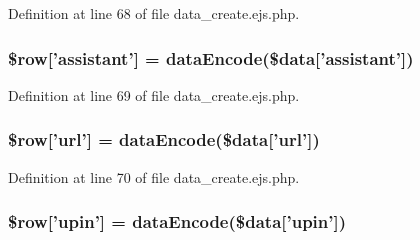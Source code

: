 \-Definition at line 68 of file data\-\_\-create.\-ejs.\-php.

\hypertarget{miscellaneous_2mysettings_2data__create_8ejs_8php_ac70ddecf301c4fec9f747b5c7c861243}{
\subsubsection[{\$row}]{\setlength{\rightskip}{0pt plus 5cm}\$row\mbox{[}'assistant'\mbox{]} = {\bf data\-Encode}(\$data\mbox{[}'assistant'\mbox{]})}}\label{miscellaneous_2mysettings_2data__create_8ejs_8php_ac70ddecf301c4fec9f747b5c7c861243}


\-Definition at line 69 of file data\-\_\-create.\-ejs.\-php.

\hypertarget{miscellaneous_2mysettings_2data__create_8ejs_8php_adf1010d02c9d45b59dd4435673a49506}{
\subsubsection[{\$row}]{\setlength{\rightskip}{0pt plus 5cm}\$row\mbox{[}'url'\mbox{]} = {\bf data\-Encode}(\$data\mbox{[}'url'\mbox{]})}}\label{miscellaneous_2mysettings_2data__create_8ejs_8php_adf1010d02c9d45b59dd4435673a49506}


\-Definition at line 70 of file data\-\_\-create.\-ejs.\-php.

\hypertarget{miscellaneous_2mysettings_2data__create_8ejs_8php_aaa10113ab6f803b651bde517d2c22961}{
\subsubsection[{\$row}]{\setlength{\rightskip}{0pt plus 5cm}\$row\mbox{[}'upin'\mbox{]} = {\bf data\-Encode}(\$data\mbox{[}'upin'\mbox{]})}}\label{miscellaneous_2mysettings_2data__create_8ejs_8php_aaa10113ab6f803b651bde517d2c22961}


